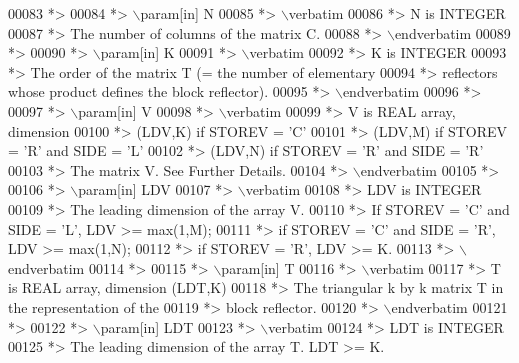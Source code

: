 \begin{DoxyCode}
00083 \textcolor{comment}{*>}
00084 \textcolor{comment}{*> \(\backslash\)param[in] N}
00085 \textcolor{comment}{*> \(\backslash\)verbatim}
00086 \textcolor{comment}{*>          N is INTEGER}
00087 \textcolor{comment}{*>          The number of columns of the matrix C.}
00088 \textcolor{comment}{*> \(\backslash\)endverbatim}
00089 \textcolor{comment}{*>}
00090 \textcolor{comment}{*> \(\backslash\)param[in] K}
00091 \textcolor{comment}{*> \(\backslash\)verbatim}
00092 \textcolor{comment}{*>          K is INTEGER}
00093 \textcolor{comment}{*>          The order of the matrix T (= the number of elementary}
00094 \textcolor{comment}{*>          reflectors whose product defines the block reflector).}
00095 \textcolor{comment}{*> \(\backslash\)endverbatim}
00096 \textcolor{comment}{*>}
00097 \textcolor{comment}{*> \(\backslash\)param[in] V}
00098 \textcolor{comment}{*> \(\backslash\)verbatim}
00099 \textcolor{comment}{*>          V is REAL array, dimension}
00100 \textcolor{comment}{*>                                (LDV,K) if STOREV = 'C'}
00101 \textcolor{comment}{*>                                (LDV,M) if STOREV = 'R' and SIDE = 'L'}
00102 \textcolor{comment}{*>                                (LDV,N) if STOREV = 'R' and SIDE = 'R'}
00103 \textcolor{comment}{*>          The matrix V. See Further Details.}
00104 \textcolor{comment}{*> \(\backslash\)endverbatim}
00105 \textcolor{comment}{*>}
00106 \textcolor{comment}{*> \(\backslash\)param[in] LDV}
00107 \textcolor{comment}{*> \(\backslash\)verbatim}
00108 \textcolor{comment}{*>          LDV is INTEGER}
00109 \textcolor{comment}{*>          The leading dimension of the array V.}
00110 \textcolor{comment}{*>          If STOREV = 'C' and SIDE = 'L', LDV >= max(1,M);}
00111 \textcolor{comment}{*>          if STOREV = 'C' and SIDE = 'R', LDV >= max(1,N);}
00112 \textcolor{comment}{*>          if STOREV = 'R', LDV >= K.}
00113 \textcolor{comment}{*> \(\backslash\)endverbatim}
00114 \textcolor{comment}{*>}
00115 \textcolor{comment}{*> \(\backslash\)param[in] T}
00116 \textcolor{comment}{*> \(\backslash\)verbatim}
00117 \textcolor{comment}{*>          T is REAL array, dimension (LDT,K)}
00118 \textcolor{comment}{*>          The triangular k by k matrix T in the representation of the}
00119 \textcolor{comment}{*>          block reflector.}
00120 \textcolor{comment}{*> \(\backslash\)endverbatim}
00121 \textcolor{comment}{*>}
00122 \textcolor{comment}{*> \(\backslash\)param[in] LDT}
00123 \textcolor{comment}{*> \(\backslash\)verbatim}
00124 \textcolor{comment}{*>          LDT is INTEGER}
00125 \textcolor{comment}{*>          The leading dimension of the array T. LDT >= K.}

\end{DoxyCode}
